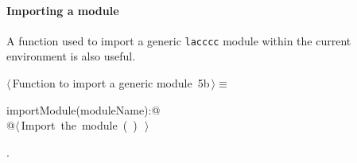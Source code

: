 \documentclass[11pt,oneside]{article}	%
\begin{document}
\paragraph{Importing a module} A function used to import a generic \texttt{lacccc} module within the current environment is also useful.
\begin{flushleft} \small
\begin{minipage}{\linewidth} \label{scrap10}
\protect{}$\langle\,$Function to import a generic module\nobreak\ {\footnotesize 5b}$\,\rangle\equiv$
\vspace{-1ex}
\begin{list}{}{} \item
\mbox{}\verb@def importModule(moduleName):@\\
\mbox{}\verb@   @\hbox{$\langle\,$Import the module\nobreak\ ({\footnotesize {}\label{scrap11}
 }\mbox{}\verb@moduleName@ ) {\footnotesize {}}$\,\rangle$}\verb@@\\
\mbox{}\verb@@{\NWsep}
\end{list}
\vspace{-1ex}
\footnotesize\addtolength{\baselineskip}{-1ex}
\begin{list}{}{\setlength{\itemsep}{-\parsep}\setlength{\itemindent}{-\leftmargin}}
\item {\NWtxtMacroNoRef}.
\end{list}
\end{minipage}\\[4ex]
\end{flushleft}




\end{document}

